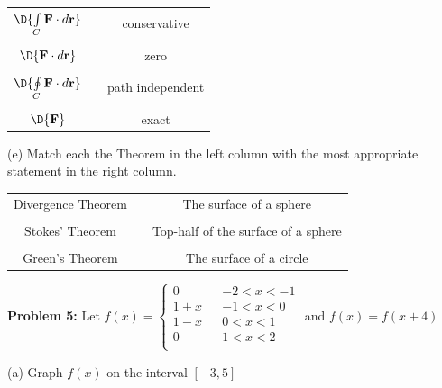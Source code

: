 \documentclass[12pt]{amsart}
\numberwithin{equation}{section}
\begin{document}
\begin{center}
\begin{tabular}{cp{5cm}c}
	$\D{\int \limits_{C} \text{\bf F}\cdot d\text{\bf r}}$ & & conservative\\
	&&\\
	$\D{\text{\bf F}\cdot d\text{\bf r}}$ & & zero\\
	&&\\
	$\D{\oint \limits_{C} \text{\bf F}\cdot d\text{\bf r}}$ & & path independent\\
	&&\\
	$\D{\text{\bf F}}$ & & exact\\
\end{tabular}
\end{center}

\vspace{2.0cm}

(e) Match each the Theorem in the left column with the most appropriate statement in the right column.

\begin{center}
\begin{tabular}{cp{5cm}c}
	Divergence Theorem & & The surface of a sphere\\
	&&\\
	Stokes' Theorem & & Top-half of the surface of a sphere\\
	&&\\
	Green's Theorem & & The surface of a circle\\
\end{tabular}
\end{center}

\thispagestyle{empty}
\newpage
\thispagestyle{empty}

{\bf Problem 5:} Let \quad
$
f(x) = 
\left\{
\begin{array}{lrc}
	0 & &-2  < x <  -1\\
	1+x & &-1  < x <   0\\
	1-x & &0  < x <   1\\
	0 & & 1  < x <   2\\
\end{array}
\right.
$  \quad and \quad $f(x) = f(x+4)$

\vspace{0.1cm}

(a) Graph $f(x)$ on the interval $[-3,5]$

\vspace{7.2cm}
\end{document}

